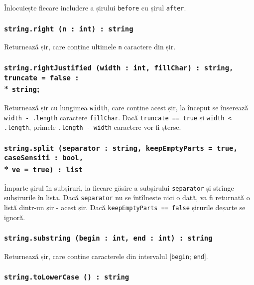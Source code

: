 Înlocuiește fiecare includere a șirului \texttt{before} cu șirul \texttt{after}.

\subsubsection{\texttt{string.right (n : int) : string}}

Returnează șir, care conține ultimele \texttt{n} caractere din șir.

\subsubsection{\texttt{string.rightJustified (width : int, fillChar) : string, truncate = false :}\\* \texttt{string};}

Returnează șir cu lungimea \texttt{width}, care conține acest șir, la început se înserează \texttt{width - .length} caractere \texttt{fillChar}. Dacă \texttt{truncate == true} și \texttt{width < .length}, primele \texttt{.length - width} caractere vor fi șterse.

\subsubsection{\texttt{string.split (separator : string, keepEmptyParts = true, caseSensiti : bool,}\\* \texttt{ve = true) : list}}

Împarte șirul în subșiruri, la fiecare găsire a subșirului \texttt{separator} și strînge subșirurile în lista. Dacă \texttt{separator} nu se întîlneste nici o dată, va fi returnată o listă dintr-un șir - acest șir. Dacă \texttt{keepEmptyParts == false} șirurile deșarte se ignoră.

\subsubsection{\texttt{string.substring (begin : int, end : int) : string}}

Returnează șir, care conține caracterele din intervalul [\texttt{begin}; \texttt{end}].

\subsubsection{\texttt{string.toLowerCase () : string}}

